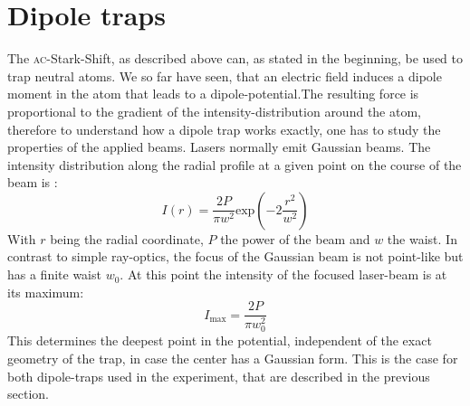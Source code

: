 \section{Dipole traps}

The \textsc{ac}-Stark-Shift, as described above can, as stated in the beginning, be used to trap neutral atoms. We so far have seen, that an electric field induces a dipole moment in the atom that leads to a dipole-potential.The resulting force is proportional to the gradient of the intensity-distribution around the atom, therefore to understand how a dipole trap works exactly, one has to study the properties of the applied beams. Lasers normally emit Gaussian beams. The intensity distribution along the radial profile at a given point on the course of the beam is \cite{dipole}:
\begin{equation}
I(r)=\frac{2P}{\pi w^2}\mathrm{exp}\left(-2\frac{r^2}{w^2}\right)
\end{equation}
With $r$ being the radial coordinate, $P$ the power of the beam and $w$ the waist. In contrast to simple ray-optics, the focus of the Gaussian beam is not point-like but has a finite waist $w_0$. At this point the intensity of the focused laser-beam is at its maximum:
\begin{equation}
I_{\mathrm{max}}=\frac{2P}{\pi w^2_0}
\end{equation}
This determines the deepest point in the potential, independent of the exact geometry of the trap, in case the center has a Gaussian form. This is the case for both dipole-traps used in the experiment, that are described in the previous section.